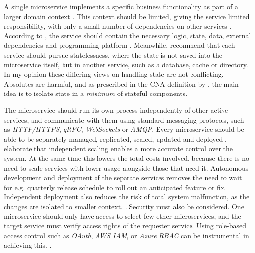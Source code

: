 \documentclass[utf8,english]{gradu3}
\begin{document}
A single microservice implements a specific business functionality as part of a
larger domain context \parencite{Microsoft2022-CNA}. This context should be limited,
giving the service limited responsibility, with only a small number of
dependencies on other services \parencite[18]{Gannon2017}. According to
\textcite{Microsoft2022-CNA}, the service should contain the necessary logic, state,
data, external dependencies and programming platform \parencite{Microsoft2022-CNA}.
Meanwhile, \textcite[18]{Gannon2017} recommend that each service should pursue
statelessness, where the state is not saved into the microservice
itself, but in another service, such as a database, cache or directory. In my
opinion these differing views on handling state are not conflicting. Absolutes
are harmful, and as prescribed in the CNA definition by
\textcite[13]{Kratzke2017}, the main idea is to isolate state in a
\textit{minimum} of stateful components.

The microservice should run its own process independently of other active
services, and communicate with them using standard messaging protocols, such as
\textit{HTTP/HTTPS}, \textit{gRPC}, \textit{WebSockets} or \textit{AMQP}. Every
microservice should be able to be separately managed, replicated, scaled,
updated and deployed \parencite[18]{Gannon2017}. \textcite{Microsoft2022-CNA}
elaborate that independent scaling enables a more accurate control over the
system. At the same time this lowers the total costs involved, because there is
no need to scale services with lower usage alongside those that need it.
Autonomous development and deployment of the separate services removes the need to wait for e.g.
quarterly release schedule to roll out an anticipated feature or fix.
Independent deployment also reduces the risk of total system malfunction, as the
changes are isolated to smaller context. \parencite{Microsoft2022-CNA}. Security
must also be considered. One microservice should only have access to select few
other microservices, and the target service must verify access rights of the
requester service. Using role-based access control such as \textit{OAuth},
\textit{AWS IAM}, or \textit{Azure RBAC} can be instrumental in achieving this.
\parencite[18]{Gannon2017}.
\end{document}
